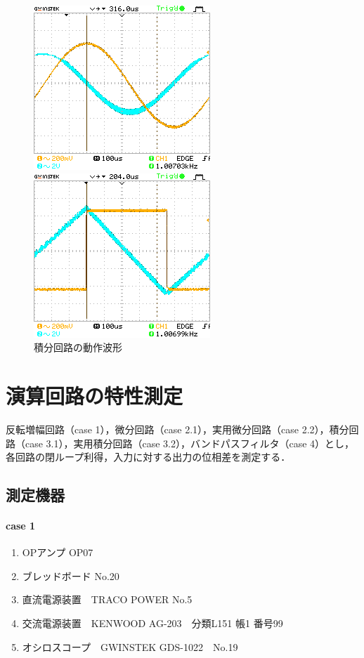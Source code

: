 \documentclass[dvipdfmx,titlepage,a4j]{jsarticle}  %
\begin{document}
\begin{figure}[H]
  \centering
  \begin{minipage}{8cm}
    \centering
    \includegraphics[keepaspectratio, scale=0.8]{../image/DS0002.png}
  \end{minipage}
  \begin{minipage}{8cm}
    \centering
    \includegraphics[keepaspectratio, scale=0.8]{../image/DS0003.png}
  \end{minipage}
  \caption{積分回路の動作波形}
  \label{fig:oc:case3}
\end{figure}

\section{演算回路の特性測定}
反転増幅回路（case 1），微分回路（case 2.1），実用微分回路（case 2.2），積分回路（case 3.1），実用積分回路（case 3.2），バンドパスフィルタ（case 4）とし，
各回路の閉ループ利得，入力に対する出力の位相差を測定する． 

\subsection{測定機器}
\paragraph{case 1}
\begin{enumerate}
  \item OPアンプ OP07
  \item ブレッドボード No.20
  \item 直流電源装置　TRACO POWER No.5
  \item 交流電源装置　KENWOOD AG-203　分類L151 帳1 番号99
  \item オシロスコープ　GWINSTEK GDS-1022　No.19
\end{enumerate}
\end{document}
